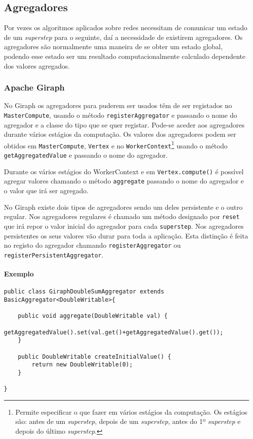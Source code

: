 \subsection{Agregadores}
\label{ss:agreg}
  Por vezes os algoritmos aplicados sobre redes necessitam de comunicar um 
estado de um \textit{superstep} para o seguinte, daí a necessidade de existirem 
agregadores. Os agregadores são normalmente uma maneira de se obter um estado 
global, podendo esse estado ser um resultado computacionalmente calculado 
dependente dos valores agregados.

  \subsubsection*{Apache Giraph}
    No Giraph os agregadores para puderem ser usados têm de ser registados no 
\texttt{MasterCompute}, usando o método \texttt{registerAggregator} e
    passando o nome do agregador e a classe do tipo que se quer registar. 
Pode-se aceder aos agregadores durante vários estágios da computação.
    Os valores dos agregadores podem ser obtidos em \texttt{MasterCompute}, 
\texttt{Vertex} e no \texttt{WorkerContext}\footnote{Permite 
especificar o que fazer em vários estágios da computação. Os estágios são: 
antes de um \textit{superstep}, depois de um \textit{superstep}, antes do 1º \textit{superstep} e depois do 
último \textit{superstep}.} usando o método \texttt{getAggregatedValue} e 
passando
    o nome do agregador.
    
    Durante os vários estágios do WorkerContext e em \texttt{Vertex.compute()} é possível agregar valores chamando o 
método \texttt{aggregate} passando o nome do agregador e o valor que irá ser agregado.
    
    No Giraph existe dois tipos de agregadores sendo um deles persistente e o 
outro regular. Nos agregadores regulares é chamado um método
    designado por \texttt{reset} que irá repor o valor inicial do agregador 
para cada \texttt{superstep}. Nos agregadores persistentes os seus valores vão 
durar
    para toda a aplicação. Esta distinção é feita no registo do agregador chamando \texttt{registerAggregator} 
    ou \texttt{registerPersistentAggregator}.
    
\paragraph{Exemplo}
\begin{verbatim}
public class GiraphDoubleSumAggregator extends BasicAggregator<DoubleWritable>{

	public void aggregate(DoubleWritable val) {
		getAggregatedValue().set(val.get()+getAggregatedValue().get());
	}

	public DoubleWritable createInitialValue() {
		return new DoubleWritable(0);
	}

}
\end{verbatim} 

